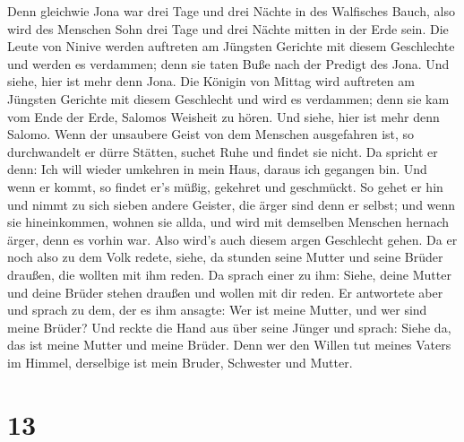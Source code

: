  Denn gleichwie Jona war drei Tage und drei Nächte in des
Walfisches Bauch, also wird des Menschen Sohn drei Tage und drei Nächte
mitten in der Erde sein.  Die Leute von Ninive werden
auftreten am Jüngsten Gerichte mit diesem Geschlechte und werden es
verdammen; denn sie taten Buße nach der Predigt des Jona. Und siehe,
hier ist mehr denn Jona.  Die Königin von Mittag wird
auftreten am Jüngsten Gerichte mit diesem Geschlecht und wird es
verdammen; denn sie kam vom Ende der Erde, Salomos Weisheit zu hören.
Und siehe, hier ist mehr denn Salomo.  Wenn der unsaubere
Geist von dem Menschen ausgefahren ist, so durchwandelt er dürre
Stätten, suchet Ruhe und findet sie nicht.  Da spricht er
denn: Ich will wieder umkehren in mein Haus, daraus ich gegangen bin.
Und wenn er kommt, so findet er's müßig, gekehret und geschmückt.
 So gehet er hin und nimmt zu sich sieben andere Geister,
die ärger sind denn er selbst; und wenn sie hineinkommen, wohnen sie
allda, und wird mit demselben Menschen hernach ärger, denn es vorhin
war. Also wird's auch diesem argen Geschlecht gehen.  Da er
noch also zu dem Volk redete, siehe, da stunden seine Mutter und seine
Brüder draußen, die wollten mit ihm reden.  Da sprach einer
zu ihm: Siehe, deine Mutter und deine Brüder stehen draußen und wollen
mit dir reden.  Er antwortete aber und sprach zu dem, der
es ihm ansagte: Wer ist meine Mutter, und wer sind meine Brüder?
 Und reckte die Hand aus über seine Jünger und sprach:
Siehe da, das ist meine Mutter und meine Brüder.  Denn wer
den Willen tut meines Vaters im Himmel, derselbige ist mein Bruder,
Schwester und Mutter.

\hypertarget{section-12}{%
\section{13}\label{section-12}}

